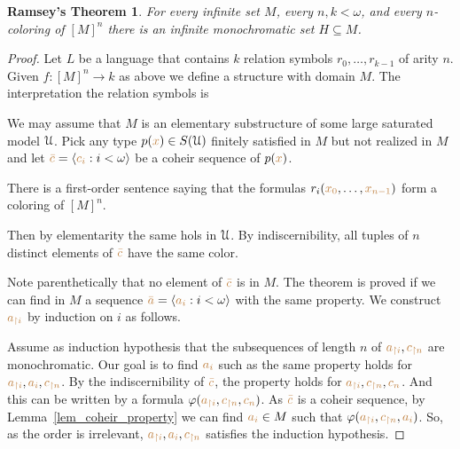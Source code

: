 \documentclass[creche.tex]{subfiles}
\begin{document}
\theoremstyle{mio}
\newtheorem{Ramsey}[thm]{Ramsey's Theorem}
\begin{Ramsey}\label{thm_Ramsey}
For every infinite set $M$, every $n,k<\omega$, and every $n$-coloring of $[M]^n$ there is an infinite monochromatic set $H\subseteq M$.
\end{Ramsey}
\begin{proof}
Let $L$ be a language that contains $k$ relation symbols $r_0,\dots,r_{k-1}$ of arity $n$.
Given $f:[M]^n\to k$ as above we define a structure with domain $M$.
The interpretation the relation symbols is




We may assume that $M$ is an elementary substructure of some large saturated model $\EuScript U$.
Pick any type $p({\color{brown} x})\in S(\EuScript U)$ finitely satisfied in $M$ but not realized in $M$ and let ${\color{brown}\bar c}=\langle{\color{brown}c_i}:i<\omega\rangle$ be a coheir sequence of $p({\color{brown} x})$.

There is a first-order sentence saying that the formulas $r_i({\color{brown} x_0},\dots,{\color{brown} x_{n-1}})$ form a coloring of $[M]^n$.

Then by elementarity the same hols in $\EuScript U$.
By indiscernibility, all tuples of $n$ distinct elements of ${\color{brown}\bar c}$ have the same color.



Note parenthetically that no element of ${\color{brown}\bar c}$ is in $M$.
The theorem is proved if we can find in $M$ a sequence ${\color{brown}\bar a}=\langle{\color{brown}a_i}:i<\omega\rangle$ with the same property.
We construct ${\color{brown} a_{\restriction i}}$ by induction on $i$ as follows.


Assume as induction hypothesis that the subsequences of length $n$ of ${\color{brown} a_{\restriction i}},{\color{brown} c_{\restriction n}}$ are monochromatic.
Our goal is to find ${\color{brown} a_i}$ such as the same property holds for ${\color{brown} a_{\restriction i}},{\color{brown} a_i},{\color{brown} c_{\restriction n}}$.
By the indiscernibility of ${\color{brown}\bar c}$, the property holds for  ${\color{brown} a_{\restriction i}},{\color{brown} c_{\restriction n}},{\color{brown}{c_n}}$.
 And this can be written by a formula $\varphi({\color{brown} a_{\restriction i}},{\color{brown} c_{\restriction n}},{\color{brown}{c_n}})$.
As ${\color{brown}\bar c}$ is a coheir sequence, by Lemma~\ref{lem_coheir_property} we can find  ${\color{brown} a_i}\in M$ such that  $\varphi({\color{brown} a_{\restriction i}},{\color{brown} c_{\restriction n}},{\color{brown} a_i})$.
So, as the order is irrelevant,  ${\color{brown} a_{\restriction i}},{\color{brown} a_i},{\color{brown} c_{\restriction n}}$ satisfies the induction hypothesis.
\end{proof}
\end{document}

